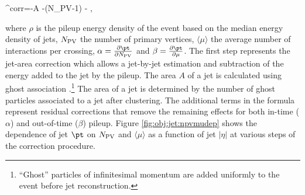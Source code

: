 \be
\pt^{\rm corr}=\pt-\rho \cdot A -\alpha \cdot (N_{\rm PV}-1) - \beta \cdot \langle\mu\rangle,
\ee

\noindent where $\rho$ is the pileup energy density of the event based on the median energy density of jets, $N_{\rm PV}$ the number of primary vertices, $\langle\mu\rangle$ the average number of interactions per crossing, $\alpha=\frac{\partial \pt}{\partial N_{\rm PV}}$ and $\beta=\frac{\partial \pt}{\partial \mu}$. The first step represents the jet-area correction which allows a jet-by-jet estimation and subtraction of the energy added to the jet by the pileup. The area $A$ of a jet is calculated using ghost association \cite{JetArea}.\footnote{ ``Ghost'' particles of infinitesimal momentum are added uniformly to the event before jet reconstruction.} The area of a jet is determined by the number of ghost particles associated to a jet after clustering. The additional terms in the formula represent residual corrections that remove the remaining effects for both in-time ($\alpha$) and out-of-time ($\beta$) pileup. Figure \ref{fig:obj:jet:npvmudep} shows the dependence of jet $\pt$ on $N_{\rm PV}$ and $\langle\mu\rangle$ as a function of jet $|\eta|$ at various steps of the correction procedure.

